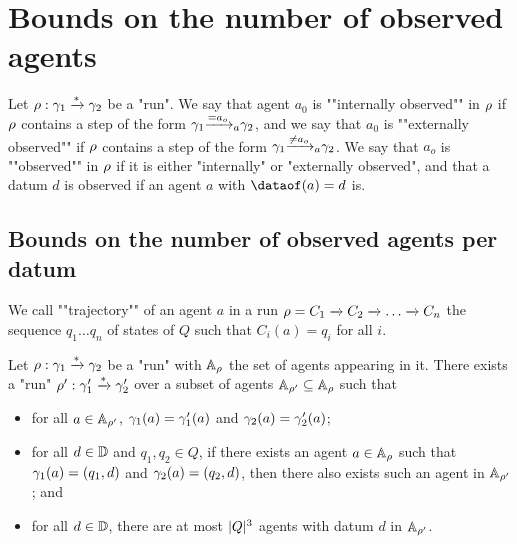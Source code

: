 \section{Bounds on the number of observed agents}
\label{sec:bounds-observed-agents}

\begin{definition}
	Let $\run : \config_1 \xrightarrow{*} \config_2$ be a "run".
	We say that agent $a_0$ is ""internally observed"" in $\run$ if $\run$ contains a step of the form $\config_1 \step{=}{a}{a_o} \config_2$, and we say that $a_0$ is ""externally observed"" if $\run$ contains a step of the form $\config_1 \step{\neq}{a}{a_o} \config_2$.
	We say that $a_o$ is ""observed"" in $\run$ if it is either "internally" or "externally observed", and that a datum $d$ is observed if an agent $a$ with $\dataof(a) =d$ is. 
\end{definition}

\subsection{Bounds on the number of observed agents per datum}

We call  ""trajectory"" of an agent $a$ in a run $\run=C_1 \xrightarrow{} C_2 \xrightarrow{} \ldots \xrightarrow{} C_n$ 
%
the sequence $q_1 \ldots q_n$ of states of $Q$ such that  $C_i(a)=q_i$ for all $i$.

\begin{lemma}
	\label{lem:agents-core-lemma}
	Let $\run : \config_1 \xrightarrow{*} \config_2$ be a "run" with $\Agentset_{\run}$ the set of agents appearing in it. There exists a "run" $\run' : \config'_1 \xrightarrow{*} \config'_2$ over a subset of agents $\Agentset_{\run'} \subseteq \Agentset_{\run}$ such that
	\begin{itemize}
		\item for all $a \in \Agentset_{\run'}$, $\config_1(a) = \config'_1(a)$ and $\config_2(a) = \config'_2(a)$;
		
		\item for all $d \in \Dataset$ and $q_1, q_2 \in Q$, if there exists an agent $a \in \Agentset_{\run}$ such that $\config_1(a) = (q_1, d)$ and $\config_2(a) = (q_2, d)$, then there also exists such an agent in $\Agentset_{\run'}$; and
		
		\item for all $d \in \Dataset$, there are at most $\size{Q}^3$ agents with datum $d$ in $\Agentset_{\run'}$.
	\end{itemize}
\end{lemma}

